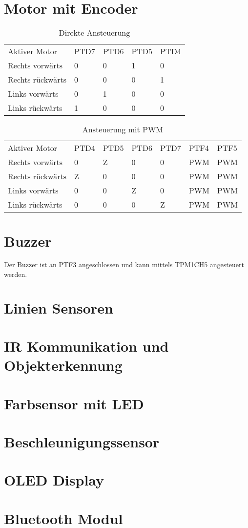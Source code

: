 \documentclass[a4paper,10pt,fleqn]{article}
\begin{document}
\section{Motor mit Encoder}
\begin{table}[h!]
\begin{tabular}{lllll}
\rowcolor{white} Aktiver Motor      & PTD7  & PTD6  & PTD5  & PTD4  \\
\rowcolor{lgray} Rechts vorwärts    & 0     & 0     & 1     & 0     \\
\rowcolor{white} Rechts rückwärts   & 0     & 0     & 0     & 1     \\
\rowcolor{lgray} Links vorwärts     & 0     & 1     & 0     & 0     \\
\rowcolor{white} Links rückwärts    & 1     & 0     & 0     & 0     \\
\end{tabular}
\caption{Direkte Ansteuerung}
\end{table}
\begin{table}[h!]
\begin{tabular}{lllllll}
\rowcolor{white} Aktiver Motor      & PTD4  & PTD5  & PTD6  & PTD7  & PTF4  & PTF5  \\
\rowcolor{lgray} Rechts vorwärts    & 0     & Z     & 0     & 0     & PWM   & PWM   \\
\rowcolor{white} Rechts rückwärts   & Z     & 0     & 0     & 0     & PWM   & PWM   \\
\rowcolor{lgray} Links vorwärts     & 0     & 0     & Z     & 0     & PWM   & PWM   \\
\rowcolor{white} Links rückwärts    & 0     & 0     & 0     & Z     & PWM   & PWM   \\
\end{tabular}
\caption{Ansteuerung mit PWM}
\end{table}

\section{Buzzer}
Der Buzzer ist an PTF3 angeschlossen und kann mittels TPM1CH5 angesteuert 
werden. 

\section{Linien Sensoren}

\section{IR Kommunikation und Objekterkennung}

\section{Farbsensor mit LED}

\section{Beschleunigungssensor}

\section{OLED Display}

\section{Bluetooth Modul}
\end{document}

